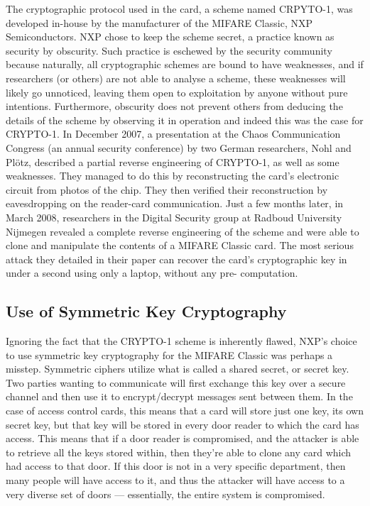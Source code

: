 \documentclass[12pt,a4paper,twoside,openright]{report}
\begin{document}
The cryptographic protocol used in the card, a scheme named CRPYTO-1, was developed in-house by the manufacturer of the MIFARE Classic, NXP Semiconductors. NXP chose to keep the scheme secret, a practice known as security by obscurity. Such practice is eschewed by the security community because naturally, all cryptographic schemes are bound to have weaknesses, and if researchers (or others) are not able to analyse a scheme, these weaknesses will likely go unnoticed, leaving them open to exploitation by anyone without pure intentions. Furthermore, obscurity does not prevent others from deducing the details of the scheme by observing it in operation and indeed this was the case for CRYPTO-1. In December 2007, a presentation at the Chaos Communication Congress (an annual security conference) by two German researchers, Nohl and Pl{\"o}tz, described a partial reverse engineering of CRYPTO-1, as well as some weaknesses. They managed to do this by reconstructing the card's electronic circuit from photos of the chip. They then verified their reconstruction by eavesdropping on the reader-card communication. Just a few months later, in March 2008, researchers in the Digital Security group at Radboud University Nijmegen revealed a complete reverse engineering of the scheme and were able to clone and manipulate the contents of a MIFARE Classic card. The most serious attack they detailed in their paper can recover the card's cryptographic key in under a second using only a laptop, without any pre- computation.

\subsection{Use of Symmetric Key Cryptography}

Ignoring the fact that the CRYPTO-1 scheme is inherently flawed, NXP's choice to use symmetric key cryptography for the MIFARE Classic was perhaps a misstep. Symmetric ciphers utilize what is called a shared secret, or secret key. Two parties wanting to communicate will first exchange this key over a secure channel and then use it to encrypt/decrypt messages sent between them. In the case of access control cards, this means that a card will store just one key, its own secret key, but that key will be stored in every door reader to which the card has access. This means that if a door reader is compromised, and the attacker is able to retrieve all the keys stored within, then they're able to clone any card which had access to that door. If this door is not in a very specific department, then many people will have access to it, and thus the attacker will have access to a very diverse set of doors --- essentially, the entire system is compromised.
\end{document}
